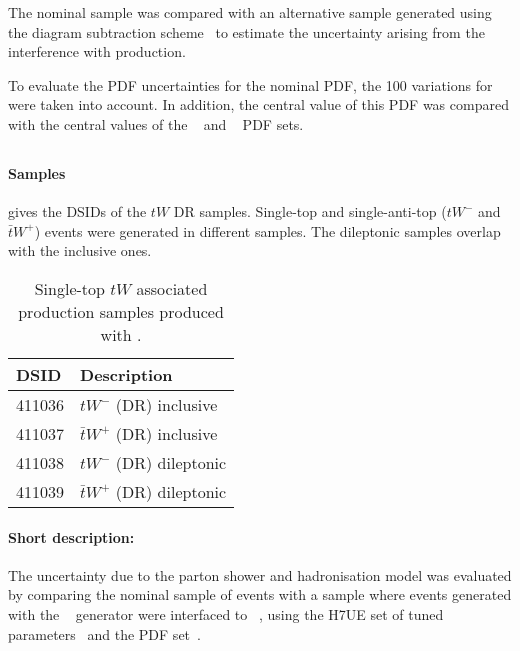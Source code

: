 

The nominal \POWPY[8] sample was compared with an alternative
sample generated using the diagram subtraction
scheme~\cite{Frixione:2008yi,ATL-PHYS-PUB-2016-020} to estimate the
uncertainty arising from the interference with \ttbar production.

To evaluate the PDF uncertainties for the nominal PDF, the 100
variations for \NNPDF[3.0nlo] were taken into account.
In addition, the central value of this PDF was compared with the
central values of the \CT[14nnlo]~\cite{Dulat:2015mca} and
\MMHT[nnlo]~\cite{Harland-Lang:2014zoa} PDF sets.


\subsection[Powheg+Herwig7]{\POWHER[7]}
\label{subsubsec:tW_PH7}

\paragraph{Samples}

 gives the DSIDs of the \(tW\) \POWHER[7] DR samples.
Single-top and single-anti-top (\(tW^-\) and \(\bar{t}W^+\)) events were generated in different samples.
The dileptonic samples overlap with the inclusive ones.

\begin{table}[htbp]
  \caption{Single-top \(tW\) associated production samples produced with \POWHER[7].}%
  \label{tab:tW_PH7}
  \centering
  \begin{tabular}{l l}
    \toprule
    DSID & Description \\
    \midrule
    411036 & \(tW^-\) (DR) inclusive \\
    411037 & \(\bar{t}W^+\) (DR) inclusive \\
    411038 & \(tW^-\) (DR) dileptonic \\
    411039 & \(\bar{t}W^+\) (DR) dileptonic \\
    \bottomrule
  \end{tabular}
\end{table}

\paragraph{Short description:}

The uncertainty due to the parton shower and hadronisation model was
evaluated by comparing the nominal sample of events with a sample where
events generated with the
\POWHEGBOX[v2]~\cite{Re:2010bp,Nason:2004rx,Frixione:2007vw,Alioli:2010xd}
generator were interfaced to
\HERWIG[7.04]~\cite{Bahr:2008pv,Bellm:2015jjp}, using the H7UE set
of tuned parameters~\cite{Bellm:2015jjp} and the \MMHT[lo] PDF set~\cite{Harland-Lang:2014zoa}.


